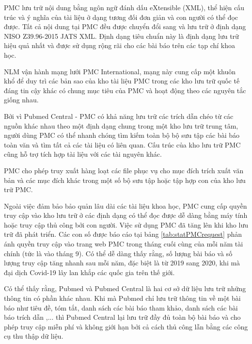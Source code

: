 \documentclass[../DoAn.tex]{subfiles}
\begin{document}
PMC lưu trữ nội dung bằng ngôn ngữ đánh dấu eXtensible (XML), thể hiện cấu trúc và ý nghĩa của tài liệu ở dạng tương đối đơn giản và con người có thể đọc được. Tất cả nội dung tại PMC đều được chuyển đổi sang và lưu trữ ở định dạng NISO Z39.96-2015 JATS XML. Định dạng tiêu chuẩn này là định dạng lưu trữ hiệu quả nhất và được sử dụng rộng rãi cho các bài báo trên các tạp chí khoa học.

NLM vận hành mạng lưới PMC International, mạng này cung cấp một khuôn khổ để duy trì các bản sao của kho tài liệu PMC trong các kho lưu trữ quốc tế đáng tin cậy khác có chung mục tiêu của PMC và hoạt động theo các nguyên tắc giống nhau.

Bởi vì Pubmed Central - PMC có khả năng lưu trữ các trích dẫn chéo từ các nguồn khác nhau theo một định dạng chung trong một kho lưu trữ trung tâm, người dùng PMC có thể nhanh chóng tìm kiếm toàn bộ bộ sưu tập các bài báo toàn văn và tìm tất cả các tài liệu có liên quan. Cấu trúc của kho lưu trữ PMC cũng hỗ trợ tích hợp tài liệu với các tài nguyên khác.

PMC cho phép truy xuất hàng loạt các file phục vụ cho mục đích trích xuất văn bản và các mục đích khác trong một số bộ sưu tập hoặc tập hợp con của kho lưu trữ PMC.

Ngoài việc đảm bảo bảo quản lâu dài các tài liệu khoa học, PMC cung cấp quyền truy cập vào kho lưu trữ ở các định dạng có thể đọc được dễ dàng bằng máy tính hoặc truy cập thủ công bởi con người. Việc sử dụng PMC đã tăng lên khi kho lưu trữ đã phát triển. Các con số được báo cáo tại bảng \ref{tab:statPMCrequest} phản ánh quyền truy cập vào trang web PMC trong tháng cuối cùng của mỗi năm tài chính (tức là vào tháng 9). Có thể dễ dàng thấy rằng, số lượng bài báo và số lượng truy cập tăng nhanh sau mỗi năm, đặc biệt là từ 2019 sang 2020, khi mà đại dịch Covid-19 lây lan khắp các quốc gia trên thế giới.

Có thể thấy rằng, Pubmed và Pubmed Central là hai cơ sở dữ liệu lưu trữ những thông tin có phần khác nhau. Khi mà Pubmed chỉ lưu trữ thông tin về một bài báo như tiêu đề, tóm tắt, danh sách các bài báo tham khảo, danh sách các bài báo trích dẫn ,... thì Pubmed Central lại lưu trữ đầy đủ toàn bộ bài báo và cho phép truy cập miễn phí và không giới hạn bởi cả cách thủ công lẫn bằng các công cụ thu thập dữ liệu. 
\end{document}

